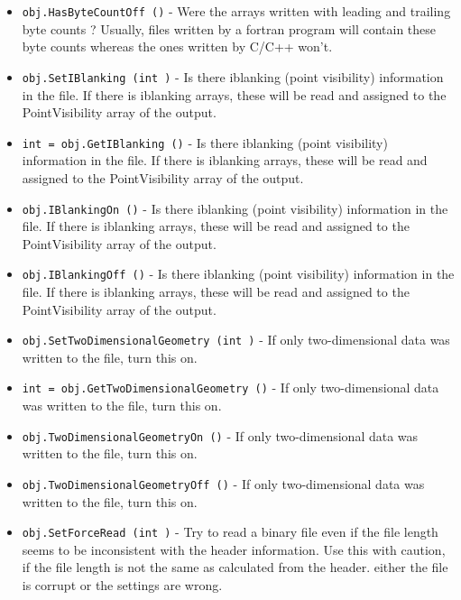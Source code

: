 \begin{itemize}
\item  \verb|obj.HasByteCountOff ()| -  Were the arrays written with leading and trailing byte counts ?
 Usually, files written by a fortran program will contain these
 byte counts whereas the ones written by C/C++ won't.

\item  \verb|obj.SetIBlanking (int )| -  Is there iblanking (point visibility) information in the file.
 If there is iblanking arrays, these will be read and assigned
 to the PointVisibility array of the output.

\item  \verb|int = obj.GetIBlanking ()| -  Is there iblanking (point visibility) information in the file.
 If there is iblanking arrays, these will be read and assigned
 to the PointVisibility array of the output.

\item  \verb|obj.IBlankingOn ()| -  Is there iblanking (point visibility) information in the file.
 If there is iblanking arrays, these will be read and assigned
 to the PointVisibility array of the output.

\item  \verb|obj.IBlankingOff ()| -  Is there iblanking (point visibility) information in the file.
 If there is iblanking arrays, these will be read and assigned
 to the PointVisibility array of the output.

\item  \verb|obj.SetTwoDimensionalGeometry (int )| -  If only two-dimensional data was written to the file,
 turn this on.

\item  \verb|int = obj.GetTwoDimensionalGeometry ()| -  If only two-dimensional data was written to the file,
 turn this on.

\item  \verb|obj.TwoDimensionalGeometryOn ()| -  If only two-dimensional data was written to the file,
 turn this on.

\item  \verb|obj.TwoDimensionalGeometryOff ()| -  If only two-dimensional data was written to the file,
 turn this on.

\item  \verb|obj.SetForceRead (int )| -  Try to read a binary file even if the file length seems to be
 inconsistent with the header information. Use this with caution,
 if the file length is not the same as calculated from the header.
 either the file is corrupt or the settings are wrong. 


\end{itemize}
